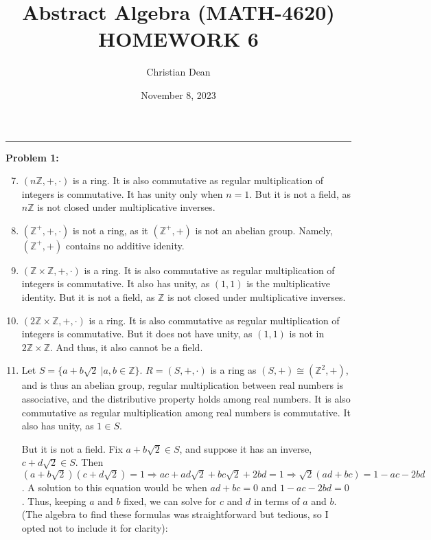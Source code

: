 \documentclass[12pt, letterpaper]{article}
\title{Abstract Algebra (MATH-4620) HOMEWORK 6}
\author{Christian Dean}
\date{November 8, 2023}
\newenvironment{problem}
    [1]
    {\noindent \textbf{Problem #1:}}
    {\vspace{3mm}}
\begin{document}
\maketitle

\noindent\hfil\rule{16cm}{0.4pt}\hfil

\begin{problem}{1}
    \begin{enumerate}
        \setcounter{enumi}{6}

        \item $(n\mathbb{Z}, +, \cdot)$ is a ring. It is also commutative as regular multiplication
        of integers is commutative. It has unity only when $n = 1$. But it is not a field, as 
        $n\mathbb{Z}$ is not closed under multiplicative inverses.

        \item $(\mathbb{Z}^+, +, \cdot)$ is not a ring, as it $(\mathbb{Z}^+, +)$ is not an abelian
        group. Namely, $(\mathbb{Z}^+, +)$ contains no additive idenity.

        \item $(\mathbb{Z} \times \mathbb{Z}, +, \cdot)$ is a ring. It is also commutative as 
        regular multiplication of integers is commutative. It also has unity, as $(1, 1)$ is the
        multiplicative identity. But it is not a field, as $\mathbb{Z}$ is not closed under 
        multiplicative inverses.

        \item $(2\mathbb{Z} \times \mathbb{Z}, +, \cdot)$ is a ring. It is also commutative as 
        regular multiplication of integers is commutative. But it does not have unity, as $(1, 1)$ 
        is not in $2\mathbb{Z} \times \mathbb{Z}$. And thus, it also cannot be a field.

        \item Let $S = \{a+b\sqrt{2}\ | a, b \in \mathbb{Z}\}$. $R = (S, +, \cdot)$ is a ring as 
        $(S, +) \cong (\mathbb{Z}^2, +)$, and is thus an abelian group, regular multiplication between 
        real numbers is associative, and the distributive property holds among real numbers. It is also 
        commutative as regular multiplication among real numbers is commutative. It also has unity, as
        $1 \in S$. 


        \bigskip\noindent
        But it is not a field. Fix $a + b\sqrt{2} \in S$, and suppose it has an inverse, $c + d\sqrt{2}
        \in S$. Then $(a + b\sqrt{2})(c + d\sqrt{2}) = 1 \Rightarrow ac + ad\sqrt{2} + bc\sqrt{2} + 2bd 
        = 1 \Rightarrow \sqrt{2}(ad + bc) = 1 - ac - 2bd$. A solution to this equation would be when
        $ad + bc = 0$ and $1 - ac - 2bd = 0$. Thus, keeping $a$ and $b$ fixed, we can solve for $c$
        and $d$ in terms of $a$ and $b$. (The algebra to find these formulas was straightforward but
        tedious, so I opted not to include it for clarity):


\end{enumerate}
\end{problem}
\end{document}
